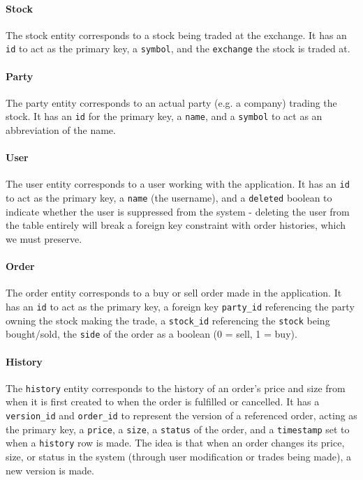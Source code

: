 \documentclass{article}
\begin{document}
\paragraph{Stock} The stock entity corresponds to a stock being traded at the exchange. It has an \texttt{id} to act as the primary key, a \texttt{symbol}, and the \texttt{exchange} the stock is traded at.

\paragraph{Party} The party entity corresponds to an actual party (e.g. a company) trading the stock. It has an \texttt{id} for the primary key, a \texttt{name}, and a \texttt{symbol} to act as an abbreviation of the name.

\paragraph{User} The user entity corresponds to a user working with the application. It has an \texttt{id} to act as the primary key, a \texttt{name} (the username), and a \texttt{deleted} boolean to indicate whether the user is suppressed from the system - deleting the user from the table entirely will break a foreign key constraint with order histories, which we must preserve.

\paragraph{Order} The order entity corresponds to a buy or sell order made in the application. It has an \texttt{id} to act as the primary key, a foreign key \texttt{party\_id} referencing the party owning the stock making the trade, a \texttt{stock\_id} referencing the \texttt{stock} being bought/sold, the \texttt{side} of the order as a boolean (0 = sell, 1 = buy).

\paragraph{History} The \texttt{history} entity corresponds to the history of an order's price and size from when it is first created to when the order is fulfilled or cancelled. It has a \texttt{version\_id} and \texttt{order\_id} to represent the version of a referenced order, acting as the primary key, a \texttt{price}, a \texttt{size}, a \texttt{status} of the order, and a \texttt{timestamp} set to when a \texttt{history} row is made. The idea is that when an order changes its price,  size, or status in the  system  (through user modification or trades being made), a new version is made.
\end{document}
